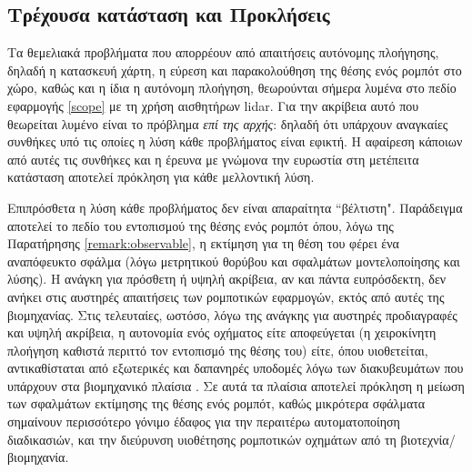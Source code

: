 \subsection{Τρέχουσα κατάσταση και Προκλήσεις}
\label{subsec:01_01_01_3}

Τα θεμελιακά προβλήματα που απορρέουν από απαιτήσεις αυτόνομης πλοήγησης,
δηλαδή η κατασκευή χάρτη, η εύρεση και παρακολούθηση της θέσης ενός ρομπότ στο
χώρο, καθώς και η ίδια η αυτόνομη πλοήγηση, θεωρούνται σήμερα λυμένα στο πεδίο
εφαρμογής \ref{scope} με τη χρήση αισθητήρων lidar. Για την ακρίβεια αυτό που
θεωρείται λυμένο είναι το πρόβλημα \textit{επί της αρχής}: δηλαδή ότι υπάρχουν
αναγκαίες συνθήκες υπό τις οποίες η λύση κάθε προβλήματος είναι εφικτή. Η
αφαίρεση κάποιων από αυτές τις συνθήκες και η έρευνα με γνώμονα την ευρωστία
στη μετέπειτα κατάσταση αποτελεί πρόκληση για κάθε μελλοντική λύση.

Επιπρόσθετα η λύση κάθε προβλήματος δεν είναι απαραίτητα ``βέλτιστη".
Παράδειγμα αποτελεί το πεδίο του εντοπισμού της θέσης ενός ρομπότ όπου, λόγω
της Παρατήρησης \ref{remark:observable}, η εκτίμηση για τη θέση του φέρει ένα
αναπόφευκτο σφάλμα (λόγω μετρητικού θορύβου και σφαλμάτων μοντελοποίησης και
λύσης).  H ανάγκη για πρόσθετη ή υψηλή ακρίβεια, αν και πάντα ευπρόσδεκτη, δεν
ανήκει στις αυστηρές απαιτήσεις των ρομποτικών εφαρμογών, εκτός από αυτές της
βιομηχανίας.  Στις τελευταίες, ωστόσο, λόγω της ανάγκης για αυστηρές
προδιαγραφές και υψηλή ακρίβεια, η αυτονομία ενός οχήματος είτε αποφεύγεται
(η χειροκίνητη πλοήγηση καθιστά περιττό τον εντοπισμό της θέσης του) είτε,
όπου υιοθετείται, αντικαθίσταται από εξωτερικές και δαπανηρές υποδομές λόγω των
διακυβευμάτων που υπάρχουν στα βιομηχανικό πλαίσια \cite{Vasiljevic2016a}. Σε
αυτά τα πλαίσια αποτελεί πρόκληση η μείωση των σφαλμάτων εκτίμησης της θέσης
ενός ρομπότ, καθώς μικρότερα σφάλματα σημαίνουν περισσότερο γόνιμο έδαφος για
την περαιτέρω αυτοματοποίηση διαδικασιών, και την διεύρυνση υιοθέτησης
ρομποτικών οχημάτων από τη βιοτεχνία/βιομηχανία.
